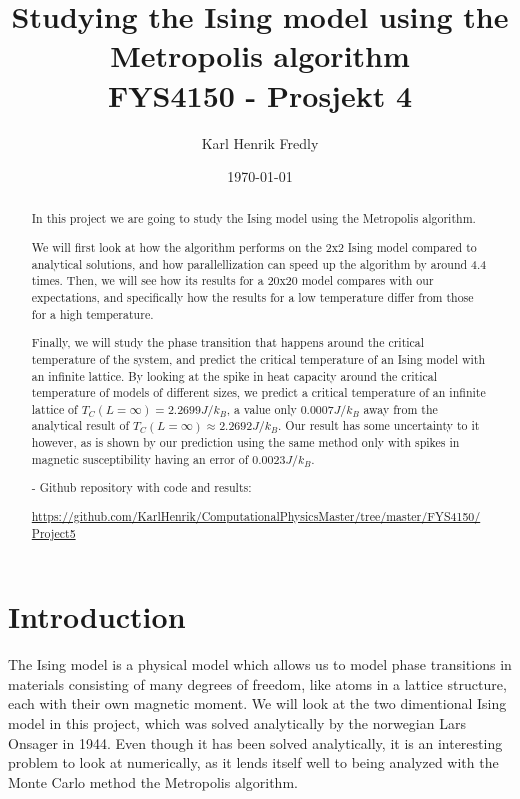 \documentclass[reprint,english,notitlepage]{revtex4-1}
\begin{document}
	
\title{Studying the Ising model using the Metropolis algorithm \\
	\normalsize FYS4150 - Prosjekt 4}
\date{\today}               
\author{Karl Henrik Fredly}

\newpage
	
\begin{abstract} %
	In this project we are going to study the Ising model using the Metropolis algorithm.
	
	We will first look at how the algorithm performs on the 2x2 Ising model compared to analytical solutions, and how parallellization can speed up the algorithm by around 4.4 times. Then, we will see how its results for a 20x20 model compares with our expectations, and specifically how the results for a low temperature differ from those for a high temperature.
	
	Finally, we will study the phase transition that happens around the critical temperature of the system, and predict the critical temperature of an Ising model with an infinite lattice. By looking at the spike in heat capacity around the critical temperature of models of different sizes, we predict a critical temperature of an infinite lattice of $T_C(L = \infty) = 2.2699 J/k_B$, a value only $0.0007J/k_B$ away from the analytical result of $T_C(L = \infty) \approx 2.2692 J/k_B$. Our result has some uncertainty to it however, as is shown by our prediction using the same method only with spikes in magnetic susceptibility having an error of $0.0023J/k_B$.
	
	- Github repository with code and results:
	
	 \href{https://github.com/KarlHenrik/ComputationalPhysicsMaster/tree/master/FYS4150/Project5}{https://github.com/KarlHenrik/ComputationalPhysicsMaster/tree/master/FYS4150/Project5}
\end{abstract}
\maketitle

\section{Introduction} %
	The Ising model is a physical model which allows us to model phase transitions in materials consisting of many degrees of freedom, like atoms in a lattice structure, each with their own magnetic moment. We will look at the two dimentional Ising model in this project, which was solved analytically by the norwegian Lars Onsager in 1944. Even though it has been solved analytically, it is an interesting problem to look at numerically, as it lends itself well to being analyzed with the Monte Carlo method the Metropolis algorithm.
\end{document}
